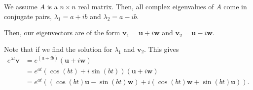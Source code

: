 \documentclass[10pt]{mypackage}
\begin{document}
\begin{example}
  We assume $A$ is a $n\times n$ real matrix. Then, all complex eigenvalues of $A$ come in conjugate pairs, $\lambda_1 = a + ib$ and $\lambda_2 = a - ib$.\newline

  Then, our eigenvectors are of the form $\mathbf{v}_1 = \mathbf{u} + i\mathbf{w}$ and $\mathbf{v}_2 = \mathbf{u} - i\mathbf{w}$.\newline

  Note that if we find the solution for $\lambda_1$ and $\mathbf{v}_2$. This gives
  \begin{align*}
    e^{\lambda t}\mathbf{v} &= e^{\left( a + ib \right)} \left( \mathbf{u} + i\mathbf{w} \right)\\
                            &= e^{at}\left( \cos\left( bt \right) + i\sin\left( bt \right) \right) \left( \mathbf{u} + i\mathbf{w} \right)\\
                            &= e^{at}\left( \left( \cos\left( bt \right) \mathbf{u} - \sin\left( bt \right)\mathbf{w} \right) + i\left( \cos\left( bt \right)\mathbf{w} + \sin\left( bt \right)\mathbf{u} \right) \right).
  \end{align*}
\end{example}
\end{document}
